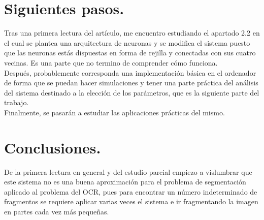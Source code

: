 \documentclass[11pt]{amsart}
\begin{document}
\section{Siguientes pasos.}

Tras una primera lectura del art\'{i}culo, me encuentro estudiando el apartado 2.2 en el cual se plantea una
arquitectura de neuronas y se modifica el sistema puesto que las neuronas est\'as dispuestas en forma de rejilla
y conectadas con sus cuatro vecinas. Es una parte que no termino de comprender c\'omo funciona.\\

Despu\'es, probablemente corresponda una implementaci\'on b\'asica en el ordenador de forma que se puedan hacer
simulaciones y tener una parte pr\'actica del an\'alisis del sistema destinado a la elecci\'on de los par\'ametros,
que es la siguiente parte del trabajo.\\

Finalmente, se pasar\'an a estudiar las aplicaciones pr\'acticas del mismo.

\section{Conclusiones.}

De la primera lectura en general y del estudio parcial empiezo a vislumbrar que este sistema no es una buena
aproximaci\'on para el problema de segmentaci\'on aplicado al problema del OCR, pues para encontrar un n\'umero
indeterminado de fragmentos se requiere aplicar varias veces el sistema e ir fragmentando la imagen en partes
cada vez m\'as peque\~nas.
\end{document}
